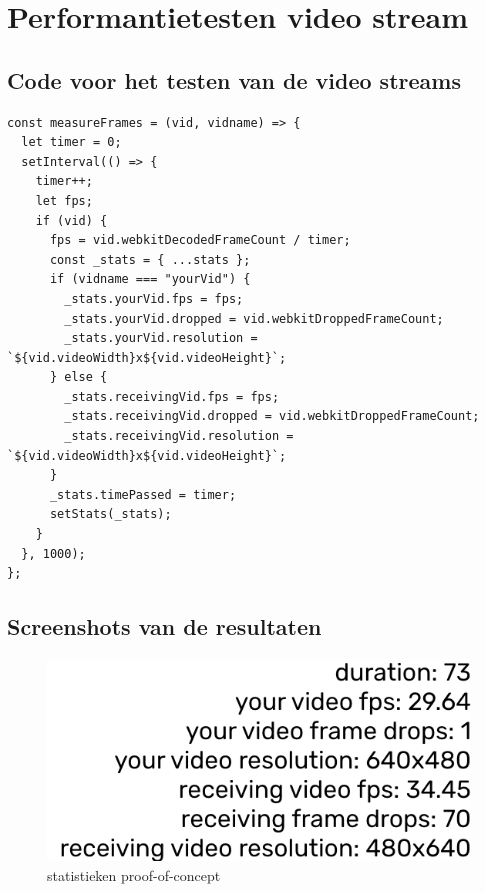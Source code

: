 \documentclass{bachproef-tin}
\begin{document}







%
%




\appendix
\renewcommand{\chaptername}{Appendix}



\chapter{Performantietesten video stream}

\section{Code voor het testen van de video streams}

\begin{lstlisting}
const measureFrames = (vid, vidname) => {
  let timer = 0;
  setInterval(() => {
    timer++;
    let fps;
    if (vid) {
      fps = vid.webkitDecodedFrameCount / timer;
      const _stats = { ...stats };
      if (vidname === "yourVid") {
        _stats.yourVid.fps = fps;
        _stats.yourVid.dropped = vid.webkitDroppedFrameCount;
        _stats.yourVid.resolution = `${vid.videoWidth}x${vid.videoHeight}`;
      } else {
        _stats.receivingVid.fps = fps;
        _stats.receivingVid.dropped = vid.webkitDroppedFrameCount;
        _stats.receivingVid.resolution = `${vid.videoWidth}x${vid.videoHeight}`;
      }
      _stats.timePassed = timer;
      setStats(_stats);
    }
  }, 1000);
};
\end{lstlisting}

\section{Screenshots van de resultaten}
\begin{figure}[H]
	\centering
	\includegraphics[width=120mm]{./img/statsPWA}		
	\caption{statistieken proof-of-concept}
\end{figure}
\end{document}
